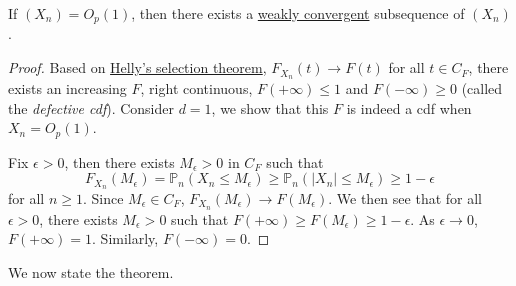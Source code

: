 \begin{theorem}\label{thm:Prokhorov}
	If \((X_n) = O_p(1)\), then there exists a \hyperref[def:converge-weakly]{weakly convergent} subsequence of \((X_n)\).
\end{theorem}
\begin{proof}%
	Based on \href{https://en.wikipedia.org/wiki/Helly%27s_selection_theorem}{Helly's selection theorem}, \(F_{X_n}(t) \to F(t)\) for all \(t \in C_F\), there exists an increasing \(F\), right continuous, \(F(+\infty ) \leq 1\) and \(F(-\infty ) \geq 0\) (called the \emph{defective cdf}). Consider \(d = 1\), we show that this \(F\) is indeed a cdf when \(X_n = O_p(1)\).

	Fix \(\epsilon > 0\), then there exists \(M_{\epsilon } > 0\) in \(C_F\) such that
	\[
		F_{X_n}(M_{\epsilon } )
		=\mathbb{P} _{n}(X_n \leq M_{\epsilon } )
		\geq \mathbb{P} _{n}(\vert X_n \vert \leq M_{\epsilon } )
		\geq 1 - \epsilon
	\]
	for all \(n \geq 1\). Since \(M_{\epsilon } \in C_F\), \(F_{X_n}(M_{\epsilon } ) \to F(M_{\epsilon } )\). We then see that for all \(\epsilon > 0\), there exists \(M_{\epsilon } > 0 \) such that \(F(+\infty ) \geq F(M_{\epsilon } ) \geq 1 - \epsilon \). As \(\epsilon \to 0\), \(F(+\infty ) = 1\). Similarly, \(F(-\infty ) = 0\).
\end{proof}

We now state the theorem.

